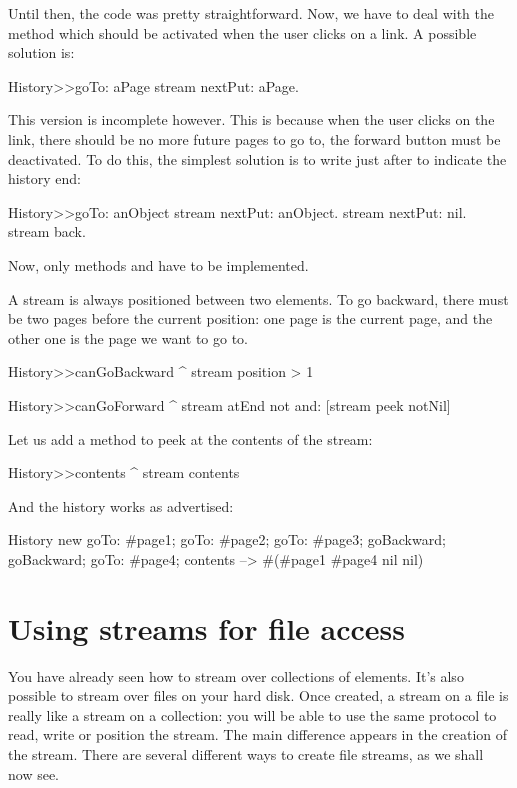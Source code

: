 \documentclass[a4paper,10pt,twoside]{book}
\begin{document}
Until then, the code was pretty straightforward. Now, we have to deal
with the  method which should be activated when the user
clicks on a link. A possible solution is:

\begin{code}{}
History>>goTo: aPage
    stream nextPut: aPage.
\end{code}

This version is incomplete however. This is because when the user
clicks on the link, there should be no more future pages to go to,
\ie the forward button must be deactivated. To do this, the simplest
solution is to write  just after to indicate the history end:

\begin{code}{}
History>>goTo: anObject
  stream nextPut: anObject.
  stream nextPut: nil.
  stream back.
\end{code}

Now, only methods  and  have to be
implemented.

A stream is always positioned between two elements. To go backward,
there must be two pages before the current position: one page is the
current page, and the other one is the page we want to go to.

\begin{code}{}
History>>canGoBackward
  ^ stream position > 1

History>>canGoForward
  ^ stream atEnd not and: [stream peek notNil]
\end{code}

Let us add a method to peek at the contents of the stream:
\begin{code}{}
History>>contents
  ^ stream contents
\end{code}

And the history works as advertised:
\begin{code}{}
History new
	goTo: #page1;
	goTo: #page2;
	goTo: #page3;
	goBackward;
	goBackward;
	goTo: #page4;
	contents --> #(#page1 #page4 nil nil)
\end{code}

\section{Using streams for file access}

You have already seen how to stream over collections of elements. It's
also possible to stream over files on your hard disk.
Once created, a stream on a file is really like a stream on a
collection: you will be able to use the same protocol to read, write
or position the stream.
The main difference appears in the creation of the stream.
There are several different ways to create file streams, as we shall now see.
\end{document}

